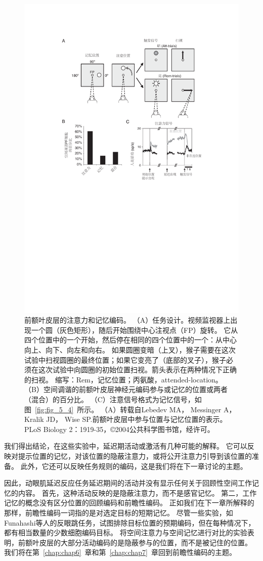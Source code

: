 \begin{figure}
	\centering
	\includegraphics[width=0.7\linewidth]{image_pfc/Fig_5_6}
	\caption{前额叶皮层的注意力和记忆编码。
		（A）任务设计。视频监视器上出现一个圆（灰色矩形），随后开始围绕中心注视点（FP）旋转。
		它从四个位置中的一个开始，然后停在相同的四个位置中的一个：从中心向上、向下、向左和向右。
		如果圆圈变暗（上叉），猴子需要在这次试验中扫视圆圈的最终位置；如果它变亮了（底部的叉子），猴子必须在这次试验中向圆圈的初始位置扫视。箭头表示在两种情况下正确的扫视。
		缩写：Rem，记忆位置；丙氨酸，attended-location。
		（B）空间调谐的前额叶皮层神经元编码参与或记忆的位置或两者（混合）的百分比。
		（C）注意信号格式为记忆信号，如图~\ref{fig:fig_5_4}~所示。
		（A）转载自Lebedev MA， Messinger A， Kralik JD， Wise SP.前额叶皮层中参与位置与记忆位置的表示。PLoS Biology 2：1919-35，©2004公共科学图书馆，经许可。}
	\label{fig:fig_5_6}
\end{figure}


我们得出结论，在这些实验中，延迟期活动或激活有几种可能的解释。
它可以反映对提示位置的记忆，对该位置的隐蔽注意力，或将公开注意力引导到该位置的准备。
此外，它还可以反映任务规则的编码，这是我们将在下一章讨论的主题。


因此，动眼肌延迟反应任务延迟期间的活动并没有显示任何关于回顾性空间工作记忆的内容。
首先，这种活动反映的是隐蔽注意力，而不是感官记忆。
第二，工作记忆的概念没有区分位置的回顾编码和前瞻性编码。
正如我们在下一章所解释的那样，前瞻性编码一词指的是对选定目标的短期记忆。
尽管一些实验，如Funahashi等人的反眼跳任务，试图排除目标位置的预期编码，但在每种情况下，都有相当数量的少数细胞编码目标。
将空间注意力与空间记忆进行对比的实验表明，前额叶皮层的大部分活动编码的是隐蔽参与的位置，而不是被记住的位置。
我们将在第~\ref{chap:chap6}~章和第~\ref{chap:chap7}~章回到前瞻性编码的主题。



